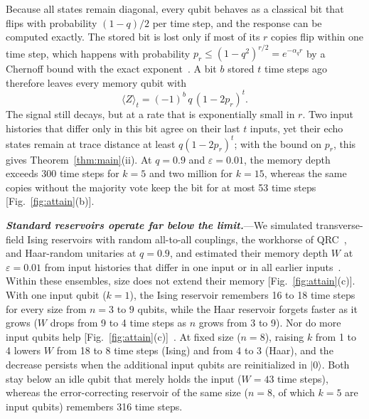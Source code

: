 \documentclass[aps,prl,twocolumn,superscriptaddress,floatfix]{revtex4-2}
\theoremstyle{plain}
\newcommand{\ket}[1]{|#1\rangle}
\newcommand{\runin}[1]{\textit{\textbf{#1}}---}
\begin{document}
Because all states remain diagonal, every qubit behaves as a classical bit that flips with probability $(1-q)/2$ per time step, and the response can be computed exactly. The stored bit is lost only if most of its $r$ copies flip within one time step, which happens with probability $p_r\le(1-q^2)^{r/2}=e^{-\alpha_qr}$ by a Chernoff bound with the exact exponent~\cite{SM}. A bit $b$ stored $t$ time steps ago therefore leaves every memory qubit with
\begin{equation}
\langle Z\rangle_t=(-1)^b\,q\,(1-2p_r)^t .
\label{eq:response}
\end{equation}
The signal still decays, but at a rate that is exponentially small in $r$. Two input histories that differ only in this bit agree on their last $t$ inputs, yet their echo states remain at trace distance at least $q(1-2p_r)^t$; with the bound on $p_r$, this gives Theorem~\ref{thm:main}(ii). At $q=0.9$ and $\varepsilon=0.01$, the memory depth exceeds 300 time steps for $k=5$ and two million for $k=15$, whereas the same copies without the majority vote keep the bit for at most 53 time steps [Fig.~\ref{fig:attain}(b)].

\runin{Standard reservoirs operate far below the limit.}We simulated transverse-field Ising reservoirs with random all-to-all couplings, the workhorse of QRC~\cite{Fujii2017,Nakajima2019,MartinezPena2021}, and Haar-random unitaries at $q=0.9$, and estimated their memory depth $W$ at $\varepsilon=0.01$ from input histories that differ in one input or in all earlier inputs~\cite{SM}. Within these ensembles, size does not extend their memory [Fig.~\ref{fig:attain}(c)]. With one input qubit ($k=1$), the Ising reservoir remembers 16 to 18 time steps for every size from $n=3$ to $9$ qubits, while the Haar reservoir forgets faster as it grows ($W$ drops from 9 to 4 time steps as $n$ grows from 3 to 9). Nor do more input qubits help [Fig.~\ref{fig:attain}(c)]~\cite{SM}. At fixed size ($n=8$), raising $k$ from 1 to 4 lowers $W$ from 18 to 8 time steps (Ising) and from 4 to 3 (Haar), and the decrease persists when the additional input qubits are reinitialized in $\ket0$. Both stay below an idle qubit that merely holds the input ($W=43$ time steps), whereas the error-correcting reservoir of the same size ($n=8$, of which $k=5$ are input qubits) remembers 316 time steps.
\end{document}
